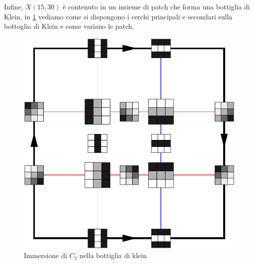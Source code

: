 Infine, $X(15,30)$ è contenuto in un insieme di patch che forma una bottiglia di Klein, in \cref{fig:kleinpatch} vediamo come si dispongono i cerchi principali e secondari sulla bottoglia di Klein e come variano le patch.

\begin{figure}[ht]
  \begin{center}
    \includegraphics[width=.6\linewidth]{gfx/kleinpatches.pdf}
    \caption{Immersione di $C_3$ nella bottiglia di klein}
    \label{fig:kleinpatch}
  \end{center}
\end{figure}
